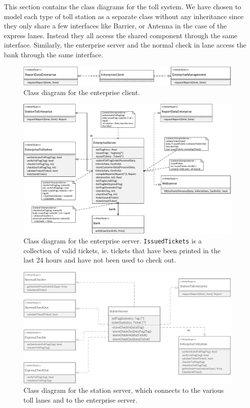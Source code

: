 This section contains the class diagrams for the toll system. We have chosen to model each type of toll station as a separate class without any inheritance since they only share a few interfaces like Barrier, or Antenna in the case of the express lanes. Instead they all access the shared component through the same interface. Similarly, the enterprise server and the normal check in lane access the bank through the same interface.

\begin{figure}[H]
\centerline{\includegraphics[width=\textwidth]{img/class_diagram/class_diagram_enterprise_client}}
\caption{Class diagram for the enterprise client.}
\label{fig:cld_ec}
\end{figure}

\begin{figure}[H]
\centerline{\includegraphics[width=\textwidth]{img/class_diagram/class_diagram_enterprise_server}}
\caption{Class diagram for the enterprise server. \texttt{IssuedTickets} is a collection of valid tickets, ie. tickets that have been printed in the last 24 hours and have not been used to check out.}
\label{fig:cld_es}
\end{figure}

\begin{figure}[H]
\centerline{\includegraphics[width=\textwidth]{img/class_diagram/class_diagram_station_server}}
\caption{Class diagram for the station server, which connects to the various toll lanes and to the enterprise server.}
\label{fig:cld_ss}
\end{figure}

